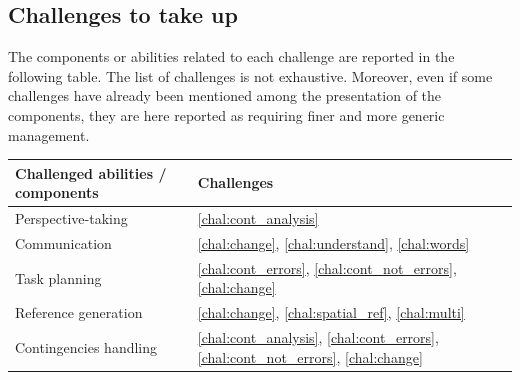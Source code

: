 \subsection{Challenges to take up}

The components or abilities related to each challenge are reported in the following table. The list of challenges is not exhaustive. Moreover, even if some challenges have already been mentioned among the presentation of the components, they are here reported as requiring finer and more generic management.

\begin{center}
 \begin{tabular}{||l | l ||} 
 \hline
 Challenged abilities / components & Challenges \\ [0.5ex]
 \hline\hline
 Perspective-taking & \ref{chal:cont_analysis}  \\ 
 \hline
 Communication & \ref{chal:change}, \ref{chal:understand}, \ref{chal:words}\\
 \hline
 Task planning & \ref{chal:cont_errors}, \ref{chal:cont_not_errors}, \ref{chal:change} \\
 \hline
 Reference generation & \ref{chal:change}, \ref{chal:spatial_ref}, \ref{chal:multi} \\
 \hline
 Contingencies handling & \ref{chal:cont_analysis}, \ref{chal:cont_errors}, \ref{chal:cont_not_errors}, \ref{chal:change} \\ [1ex]
 \hline
\end{tabular}
\end{center}

